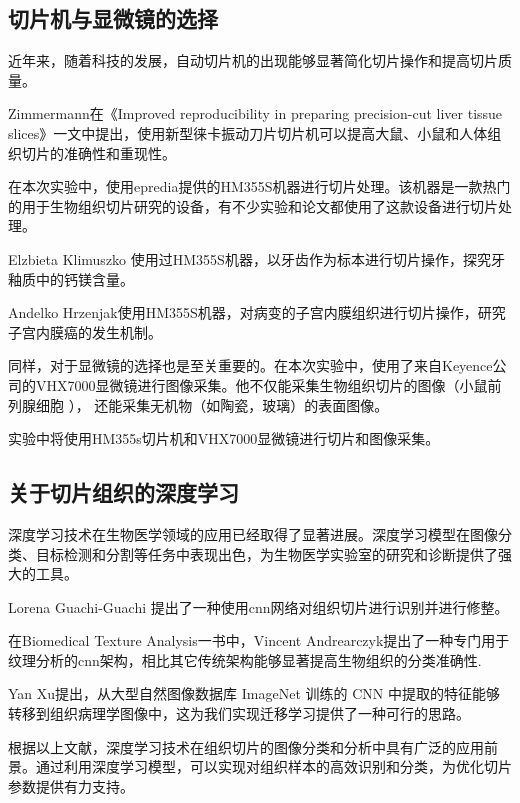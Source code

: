 \subsection{切片机与显微镜的选择}


近年来，随着科技的发展，自动切片机的出现能够显著简化切片操作和提高切片质量。

Zimmermann在《Improved reproducibility in preparing precision-cut liver tissue slices》一文中提出，使用新型徕卡振动刀片切片机可以提高大鼠、小鼠和人体组织切片的准确性和重现性。\cite{LR.1}


在本次实验中，使用epredia提供的HM355S机器进行切片处理。该机器是一款热门的用于生物组织切片研究的设备，有不少实验和论文都使用了这款设备进行切片处理。

Elzbieta Klimuszko 使用过HM355S机器，以牙齿作为标本进行切片操作，探究牙釉质中的钙镁含量。\cite{LR.2}


Andelko Hrzenjak使用HM355S机器，对病变的子宫内膜组织进行切片操作，研究子宫内膜癌的发生机制。\cite{LR.3}

同样，对于显微镜的选择也是至关重要的。在本次实验中，使用了来自Keyence公司的VHX7000显微镜进行图像采集。他不仅能采集生物组织切片的图像（小鼠前列腺细胞
\cite{LR.4}
），
还能采集无机物（如陶瓷\cite{LR.5}，玻璃\cite{LR.6}）的表面图像。


实验中将使用HM355s切片机和VHX7000显微镜进行切片和图像采集。


\subsection{关于切片组织的深度学习}

深度学习技术在生物医学领域的应用已经取得了显著进展。深度学习模型在图像分类、目标检测和分割等任务中表现出色，为生物医学实验室的研究和诊断提供了强大的工具。

Lorena Guachi-Guachi 提出了一种使用cnn网络对组织切片进行识别并进行修整。\cite{LR.7}



在Biomedical Texture Analysis一书中，Vincent Andrearczyk提出了一种专门用于纹理分析的cnn架构，相比其它传统架构能够显著提高生物组织的分类准确性.\cite{LR.8}



Yan Xu提出，从大型自然图像数据库 ImageNet 训练的 CNN 中提取的特征能够转移到组织病理学图像中，这为我们实现迁移学习提供了一种可行的思路。\cite{LR.9}


根据以上文献，深度学习技术在组织切片的图像分类和分析中具有广泛的应用前景。通过利用深度学习模型，可以实现对组织样本的高效识别和分类，为优化切片参数提供有力支持。

\FloatBarrier %
